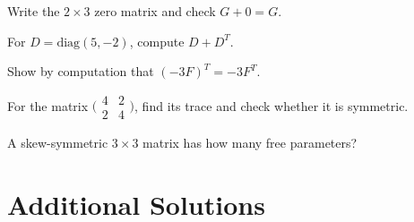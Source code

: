 \begin{problems}
  \item Write the $2 \times 3$ zero matrix and check $G + 0 = G$.
  \item For $D = \mathrm{diag}(5, -2)$, compute $D + D^{T}$.
  \item Show by computation that $(-3 F)^{T} = -3 F^{T}$.
  \item For the matrix $\bigl(\begin{smallmatrix} 4 & 2 \\ 2 & 4 \end{smallmatrix}\bigr)$, find its trace and check whether it is symmetric.
  \item A skew-symmetric $3 \times 3$ matrix has how many free parameters?
\end{problems}

\section{Additional Solutions}

